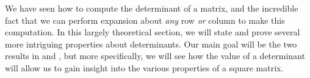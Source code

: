 %
\begin{introduction}
\begin{para}We have seen how to compute the determinant of a matrix, and the incredible fact that we can perform expansion about {\em any} row {\em or} column to make this computation.  In this largely theoretical section, we will state and prove several more intriguing properties about determinants.  Our main goal will be the two results in  and , but more specifically, we will see how the value of a determinant will allow us to gain insight into the various properties of a square matrix.\end{para}
\end{introduction}
%

